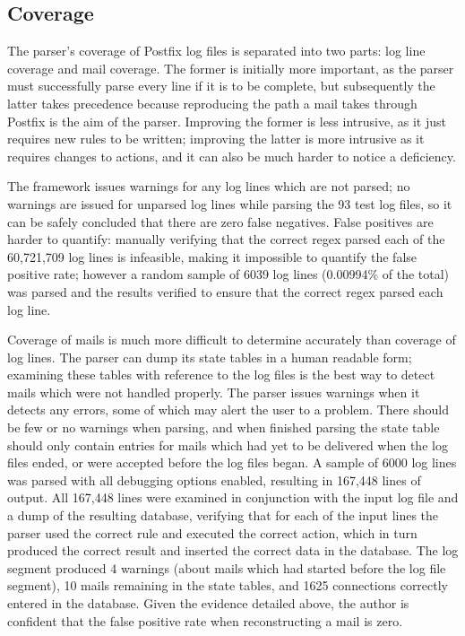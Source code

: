 \documentclass[draft]{svmult}
\newcommand{\numberOFlogFILES}[0]{%
    93%
}
\begin{document}
\subsection{Coverage}

\label{coverage}

The parser's coverage of Postfix log files is separated into two parts: log
line coverage and mail coverage.  The former is initially more important,
as the parser must successfully parse every line if it is to be complete,
but subsequently the latter takes precedence because reproducing the path a
mail takes through Postfix is the aim of the parser.  Improving the former
is less intrusive, as it just requires new rules to be written; improving
the latter is more intrusive as it requires changes to actions, and it can
also be much harder to notice a deficiency.

The framework issues warnings for any log lines which are not parsed; no
warnings are issued for unparsed log lines while parsing the
\numberOFlogFILES{} test log files, so it can be safely concluded that
there are zero false negatives.  False positives are harder to quantify:
manually verifying that the correct regex parsed each of the 60,721,709 log
lines is infeasible, making it impossible to quantify the false positive
rate; however a random sample of 6039 log lines (0.00994\% of the total)
was parsed and the results verified to ensure that the correct regex parsed
each log line.

Coverage of mails is much more difficult to determine accurately than
coverage of log lines.  The parser can dump its state tables in a human
readable form; examining these tables with reference to the log files is
the best way to detect mails which were not handled properly.  The parser
issues warnings when it detects any errors, some of which may alert the
user to a problem.  There should be few or no warnings when parsing, and
when finished parsing the state table should only contain entries for mails
which had yet to be delivered when the log files ended, or were accepted
before the log files began.  A sample of 6000 log lines was parsed with all
debugging options enabled, resulting in 167,448 lines of output.  All
167,448 lines were examined in conjunction with the input log file and a
dump of the resulting database, verifying that for each of the input lines
the parser used the correct rule and executed the correct action, which in
turn produced the correct result and inserted the correct data in the
database.  The log segment produced 4 warnings (about mails which had
started before the log file segment), 10 mails remaining in the state
tables, and 1625 connections correctly entered in the database.  Given the
evidence detailed above, the author is confident that the false positive
rate when reconstructing a mail is zero.
\end{document}
